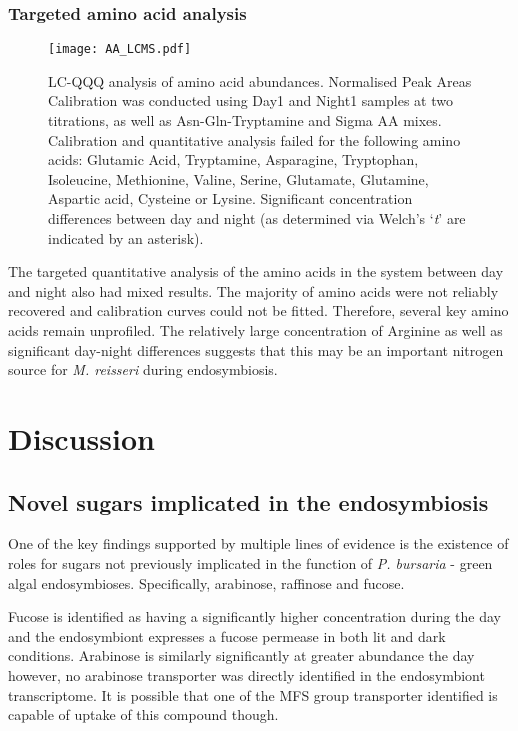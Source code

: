 \subsubsection{Targeted amino acid analysis}

\begin{figure}
    \texttt{[image: AA\_LCMS.pdf]}
    \caption[LC-QQQ quantitative analysis of amino acids]{LC-QQQ analysis
        of amino acid abundances. Normalised Peak Areas 
        Calibration was conducted using Day1 and Night1 samples at two titrations, as well as Asn-Gln-Tryptamine and Sigma AA mixes.
    Calibration and quantitative analysis failed for the following amino acids: 
Glutamic Acid, Tryptamine, Asparagine, Tryptophan, Isoleucine, Methionine, Valine, Serine, Glutamate, Glutamine, Aspartic acid, Cysteine or Lysine.
    Significant concentration differences between day and night (as determined via Welch's `\textit{t}' are indicated by an asterisk).}
    \label{fig:amino_acids}
\end{figure}

The targeted quantitative analysis of the amino acids in the system
between day and night also had mixed results.  The majority of amino
acids were not reliably recovered and calibration curves could not be fitted.
Therefore, several key amino acids remain unprofiled.
The relatively large concentration of Arginine as well as significant
day-night differences suggests that this may be an important nitrogen
source for \textit{M. reisseri} during endosymbiosis.


\section{Discussion}

\subsection{Novel sugars implicated in the endosymbiosis}

One of the key findings supported by multiple lines of evidence
is the existence of roles for sugars not previously implicated in the
function of \textit{P. bursaria} - green algal endosymbioses. 
Specifically, arabinose, raffinose and fucose. 

Fucose is identified as having a significantly higher concentration during the day 
and the endosymbiont expresses a fucose permease in both lit and dark conditions.
Arabinose is similarly significantly at greater abundance the day 
however, no arabinose transporter was directly identified in the endosymbiont 
transcriptome.  It is possible that one of the MFS group transporter identified is 
capable of uptake of this compound though. 

